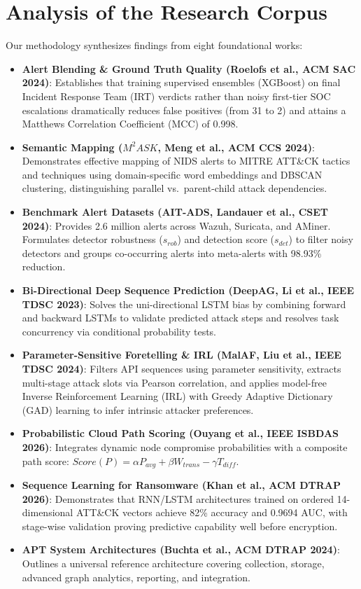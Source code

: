 \documentclass[11pt,a4paper]{article}
\begin{document}
\section{Analysis of the Research Corpus}
Our methodology synthesizes findings from eight foundational works:
\begin{itemize}
    \item \textbf{Alert Blending \& Ground Truth Quality (Roelofs et al., ACM SAC 2024)}: Establishes that training supervised ensembles (XGBoost) on final Incident Response Team (IRT) verdicts rather than noisy first-tier SOC escalations dramatically reduces false positives (from 31 to 2) and attains a Matthews Correlation Coefficient (MCC) of 0.998.
    \item \textbf{Semantic Mapping ($M^2ASK$, Meng et al., ACM CCS 2024)}: Demonstrates effective mapping of NIDS alerts to MITRE ATT\&CK tactics and techniques using domain-specific word embeddings and DBSCAN clustering, distinguishing parallel vs.\ parent-child attack dependencies.
    \item \textbf{Benchmark Alert Datasets (AIT-ADS, Landauer et al., CSET 2024)}: Provides 2.6 million alerts across Wazuh, Suricata, and AMiner. Formulates detector robustness ($s_{rob}$) and detection score ($s_{det}$) to filter noisy detectors and groups co-occurring alerts into meta-alerts with 98.93\% reduction.
    \item \textbf{Bi-Directional Deep Sequence Prediction (DeepAG, Li et al., IEEE TDSC 2023)}: Solves the uni-directional LSTM bias by combining forward and backward LSTMs to validate predicted attack steps and resolves task concurrency via conditional probability tests.
    \item \textbf{Parameter-Sensitive Foretelling \& IRL (MalAF, Liu et al., IEEE TDSC 2024)}: Filters API sequences using parameter sensitivity, extracts multi-stage attack slots via Pearson correlation, and applies model-free Inverse Reinforcement Learning (IRL) with Greedy Adaptive Dictionary (GAD) learning to infer intrinsic attacker preferences.
    \item \textbf{Probabilistic Cloud Path Scoring (Ouyang et al., IEEE ISBDAS 2026)}: Integrates dynamic node compromise probabilities with a composite path score: $Score(P) = \alpha P_{avg} + \beta W_{trans} - \gamma T_{diff}$.
    \item \textbf{Sequence Learning for Ransomware (Khan et al., ACM DTRAP 2026)}: Demonstrates that RNN/LSTM architectures trained on ordered 14-dimensional ATT\&CK vectors achieve 82\% accuracy and 0.9694 AUC, with stage-wise validation proving predictive capability well before encryption.
    \item \textbf{APT System Architectures (Buchta et al., ACM DTRAP 2024)}: Outlines a universal reference architecture covering collection, storage, advanced graph analytics, reporting, and integration.
\end{itemize}
\end{document}
